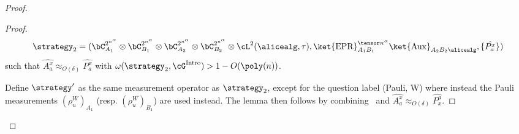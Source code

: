 \begin{proof}
\begin{proof}
		\begin{equation*}
			\strategy_2 = (\bC^{2^{n^{\alpha}}}_{A_1} \otimes \bC^{2^{n^{\alpha}}}_{B_1} \otimes \bC^{2^{n^{\alpha}}}_{A_2} \otimes \bC^{2^{n^{\alpha}}}_{B_2} \otimes  \cL^2(\alicealg, \tau), \ket{\text{EPR}}^{\tensor n^{\alpha}}_{A_1 B_1} \ket{\text{Aux}}_{A_2 B_2 \alicealg},  \{\hat{P^x_a}\})
		\end{equation*}
		such that $\hat{A_a^x} \approx_{O(\delta)} \hat{P^x_a}$ with $\omega(\strategy_2, \cG^{\text{Intro}}) > 1 - O(\poly(n))$. 
		
		Define $\strategy'$ as the same measurement operator as $\strategy_2 $, except for the question label (Pauli, W) where instead the Pauli measurements $(\rho^{W}_u)_{A_1}$ (resp. $(\rho^{W}_u)_{B_1}$) are used instead. The lemma then follows by combining~ and $\hat{A_a^x} \approx_{O(\delta)} \hat{P^a_x}$. 
	\end{proof}


\end{proof}

